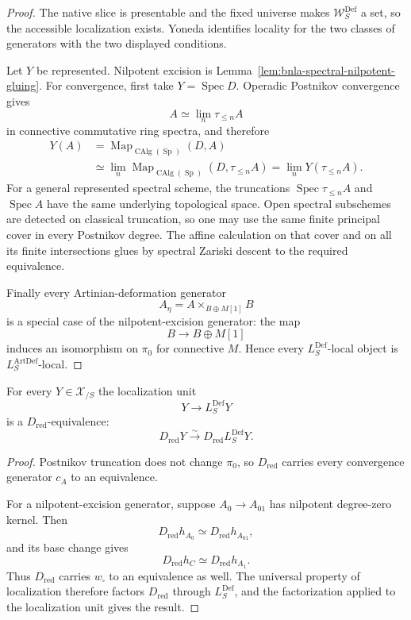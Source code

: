 \begin{proof}
The native slice is presentable and the fixed universe makes
$\mathcal W^{\mathrm{Def}}_S$ a set, so the accessible localization exists.
Yoneda identifies locality for the two classes of generators with the two
displayed conditions.

Let $Y$ be represented.  Nilpotent excision is
Lemma~\ref{lem:bnla-spectral-nilpotent-gluing}.  For convergence, first take
$Y=\operatorname{Spec}D$.  Operadic Postnikov convergence gives
\[
    A\simeq\lim_n\tau_{\leq n}A
\]
in connective commutative ring spectra, and therefore
\[
\begin{aligned}
    Y(A)
    &=
    \operatorname{Map}_{\operatorname{CAlg}(\operatorname{Sp})}(D,A)\\
    &\simeq
    \lim_n
    \operatorname{Map}_{\operatorname{CAlg}(\operatorname{Sp})}
    (D,\tau_{\leq n}A)
    =
    \lim_nY(\tau_{\leq n}A).
\end{aligned}
\]
For a general represented spectral scheme, the truncations
$\operatorname{Spec}\tau_{\leq n}A$ and $\operatorname{Spec}A$ have the same
underlying topological space.  Open spectral subschemes are detected on
classical truncation, so one may use the same finite principal cover in every
Postnikov degree.  The affine calculation on that cover and on all its finite
intersections glues by spectral Zariski descent to the required equivalence.

Finally every Artinian-deformation generator
\[
    A_\eta=A\times_{B\oplus M[1]}B
\]
is a special case of the nilpotent-excision generator: the map
\[
    B\longrightarrow B\oplus M[1]
\]
induces an isomorphism on $\pi_0$ for connective $M$.  Hence every
$L^{\mathrm{Def}}_S$-local object is
$L^{\mathrm{ArtDef}}_S$-local.
\end{proof}

\begin{proposition}
\label{prop:bnla-def-dred-equivalence}
For every $Y\in\mathcal X_{/S}$ the localization unit
\[
    Y\longrightarrow L^{\mathrm{Def}}_S Y
\]
is a $D_{\mathrm{red}}$-equivalence:
\[
\boxed{
    D_{\mathrm{red}}Y
    \xrightarrow{\sim}
    D_{\mathrm{red}}L^{\mathrm{Def}}_S Y.}
\]
\end{proposition}

\begin{proof}
Postnikov truncation does not change $\pi_0$, so $D_{\mathrm{red}}$ carries
every convergence generator $c_A$ to an equivalence.

For a nilpotent-excision generator, suppose
$A_0\to A_{01}$ has nilpotent degree-zero kernel.  Then
\[
    D_{\mathrm{red}}h_{A_0}
    \simeq
    D_{\mathrm{red}}h_{A_{01}},
\]
and its base change gives
\[
    D_{\mathrm{red}}h_C
    \simeq
    D_{\mathrm{red}}h_{A_1}.
\]
Thus $D_{\mathrm{red}}$ carries $w_\square$ to an equivalence as well.
The universal property of localization therefore factors
$D_{\mathrm{red}}$ through $L^{\mathrm{Def}}_S$, and the factorization applied
to the localization unit gives the result.
\end{proof}

